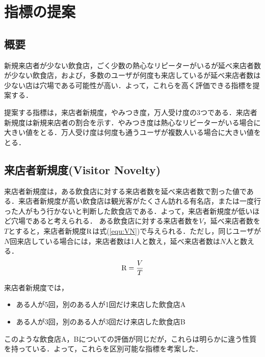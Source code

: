 \chapter{指標の提案}
\label{chap:proposal}

\section{概要}
新規来店者が少ない飲食店，ごく少数の熱心なリピーターがいるが延べ来店者数が少ない飲食店，および，多数のユーザが何度も来店しているが延べ来店者数は少ない店は穴場である可能性が高い．よって，これらを高く評価できる指標を提案する．\par
提案する指標は，来店者新規度，やみつき度，万人受け度の3つである．来店者新規度は新規来店者の割合を示す．やみつき度は熱心なリピーターがいる場合に大きい値をとる．万人受け度は何度も通うユーザが複数人いる場合に大きい値をとる．


\section{来店者新規度(Visitor Novelty)}

来店者新規度は，ある飲食店に対する来店者数を延べ来店者数で割った値である．来店者新規度が高い飲食店は観光客がたくさん訪れる有名店，または一度行った人がもう行かないと判断した飲食店である．よって，来店者新規度が低いほど穴場であると考えられる．
ある飲食店に対する来店者数を$V$，延べ来店者数を$T$とすると，来店者新規度$\rm R$は式(\ref{equ:VN})で与えられる．ただし，同じユーザが$N$回来店している場合には，来店者数は1人と数え，延べ来店者数は$N$人と数える．
\begin{equation}
	\label{equ:VN}
	{\rm R} = \frac{V}{T}
\end{equation}

来店者新規度では，
\begin{itemize}
\item ある人が5回，別のある人が1回だけ来店した飲食店A
\item ある人が3回，別のある人が3回だけ来店した飲食店B
\end{itemize}
このような飲食店A，Bについての評価が同じだが，これらは明らかに違う性質を持っている．よって，これらを区別可能な指標を考案した．

